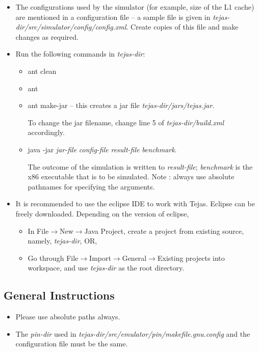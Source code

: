 \documentclass[margin=0.1in]{article}
\begin{document}
\begin{itemize}

\item
The configurations used by the simulator (for example, size of the L1 cache) are mentioned in a configuration file -- a sample file is given in {\em tejas-dir/src/simulator/config/config.xml}. Create copies of this file and make changes as required.

\item
Run the following commands in {\em tejas-dir}:
\begin{itemize}
\item ant clean
\item ant
\item ant make-jar -- this creates a jar file {\em tejas-dir/jars/tejas.jar}.

To change the jar filename, change line 5 of {\em tejas-dir/build.xml} accordingly.

\item java -jar {\em jar-file} {\em config-file} {\em result-file} {\em benchmark}.

The outcome of the simulation is written to {\em result-file}; {\em benchmark} is the x86 executable that is to be simulated. Note : always use absolute pathnames for specifying the arguments.
\end{itemize}

\item
It is recommended to use the eclipse IDE to work with Tejas. Eclipse can be freely downloaded. Depending on the version of eclipse,

\begin{itemize}
\item
In File$\rightarrow$New$\rightarrow$Java Project, create a project from existing source, namely, {\em tejas-dir}, OR,
\item
Go through File$\rightarrow$Import$\rightarrow$General$\rightarrow$Existing projects into workspace, and use {\em tejas-dir} as the root directory.
\end{itemize}

\end{itemize}


\subsection*{General Instructions}

\begin{itemize}

\item
Please use absolute paths always.

\item
The {\em pin-dir} used in {\em tejas-dir/src/emulator/pin/makefile.gnu.config} and the configuration file must be the same.

\end{itemize}
\end{document}
